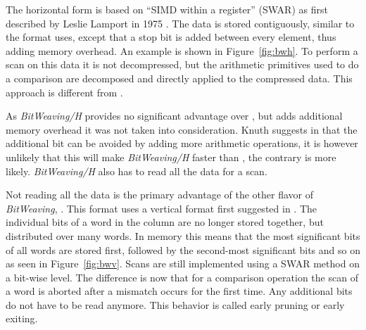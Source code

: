 The horizontal form is based on ``SIMD within a register'' (SWAR) as first
described by Leslie Lamport in 1975 \cite{SWAR}. The data is stored
contiguously, similar to the format \simdscan{} uses, except that a stop bit is
added between every element, thus adding memory overhead. An example is shown in
Figure~\ref{fig:bwh}. To perform a scan on this data it is not decompressed, but
the arithmetic primitives used to do a comparison are decomposed and directly
applied to the compressed data. This approach is different from \simdscan{}.

As \emph{BitWeaving/H} provides no significant advantage over \simdscan{}, but
adds additional memory overhead it was not taken into consideration. Knuth
suggests in \cite{SWAR} that the additional bit can be avoided by adding more
arithmetic operations, it is however unlikely that this will make
\emph{BitWeaving/H} faster than \simdscan{}, the contrary is more likely.
\emph{BitWeaving/H} also has to read all the data for a scan.

Not reading all the data is the primary advantage of the other flavor of
\emph{BitWeaving}, \bwv{}. This format uses a vertical format first suggested in
\cite{oneill}. The individual bits of a word in the column are no longer stored
together, but distributed over many words. In memory this means that the most
significant bits of all words are stored first, followed by the second-most
significant bits and so on as seen in Figure~\ref{fig:bwv}. Scans are still
implemented using a SWAR method on a bit-wise level. The difference is now that
for a comparison operation the scan of a word is aborted after a mismatch occurs
for the first time. Any additional bits do not have to be read anymore. This
behavior is called early pruning or early exiting.

